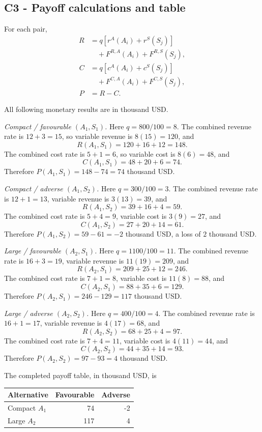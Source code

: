 {	
	\label{subsec:cold-chain-distribution-c1-c3-c3-payoff-calculations-table}
	\subsection*{C3 - Payoff calculations and table }
	
	For each pair,
	\[
	\begin{aligned}
		R&=q[r^A(A_i)+r^S(S_j)]\\
		&\quad+F^{R,A}(A_i)+F^{R,S}(S_j),
	\end{aligned}
	\]
	\[
	\begin{aligned}
		C&=q[c^A(A_i)+c^S(S_j)]\\
		&\quad+F^{C,A}(A_i)+F^{C,S}(S_j),\\
		P&=R-C.
	\end{aligned}
	\]

	All following monetary results are in thousand USD.

	\textit{Compact / favourable \((A_1,S_1)\).} Here \(q=800/100=8\). The combined revenue rate is \(12+3=15\), so variable revenue is \(8(15)=120\), and
	\[
	R(A_1,S_1)=120+16+12=148.
	\]
	The combined cost rate is \(5+1=6\), so variable cost is \(8(6)=48\), and
	\[
	C(A_1,S_1)=48+20+6=74.
	\]
	Therefore \(P(A_1,S_1)=148-74=74\) thousand USD.

	\textit{Compact / adverse \((A_1,S_2)\).} Here \(q=300/100=3\). The combined revenue rate is \(12+1=13\), variable revenue is \(3(13)=39\), and
	\[
	R(A_1,S_2)=39+16+4=59.
	\]
	The combined cost rate is \(5+4=9\), variable cost is \(3(9)=27\), and
	\[
	C(A_1,S_2)=27+20+14=61.
	\]
	Therefore \(P(A_1,S_2)=59-61=-2\) thousand USD, a loss of \(2\) thousand USD.

	\textit{Large / favourable \((A_2,S_1)\).} Here \(q=1100/100=11\). The combined revenue rate is \(16+3=19\), variable revenue is \(11(19)=209\), and
	\[
	R(A_2,S_1)=209+25+12=246.
	\]
	The combined cost rate is \(7+1=8\), variable cost is \(11(8)=88\), and
	\[
	C(A_2,S_1)=88+35+6=129.
	\]
	Therefore \(P(A_2,S_1)=246-129=117\) thousand USD.

	\textit{Large / adverse \((A_2,S_2)\).} Here \(q=400/100=4\). The combined revenue rate is \(16+1=17\), variable revenue is \(4(17)=68\), and
	\[
	R(A_2,S_2)=68+25+4=97.
	\]
	The combined cost rate is \(7+4=11\), variable cost is \(4(11)=44\), and
	\[
	C(A_2,S_2)=44+35+14=93.
	\]
	Therefore \(P(A_2,S_2)=97-93=4\) thousand USD.

	The completed payoff table, in thousand USD, is
	\begin{center}
		\begin{tabular}{lrr}
			\toprule
			Alternative & Favourable & Adverse\\
			\midrule
			Compact \(A_1\)&74&-2\\
			Large \(A_2\)&117&4\\
			\bottomrule
		\end{tabular}
	\end{center}


	\vspace{-8mm}

	}


